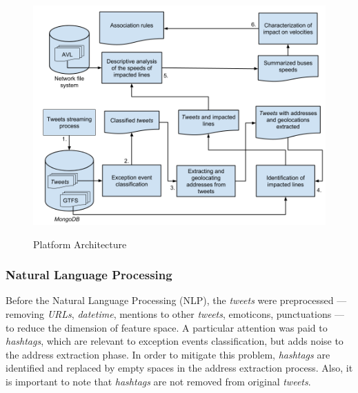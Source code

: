 \documentclass[runningheads]{llncs}
\begin{document}
\begin{figure}[!htb]
	\centering
 	  \caption{Platform Architecture}
		\includegraphics[width=0.7\linewidth]{caracterization_flow_en.png}
	\label{fig:caracterization_flow_en}
\end{figure}

\subsubsection{Natural Language Processing}
\label{nlp}

Before the Natural Language Processing (NLP), the \textit{tweets} were preprocessed --- removing \textit{URLs}, \textit{datetime}, mentions to other \textit{tweets}, emoticons, punctuations --- to reduce the dimension of feature space. A particular attention was paid to \textit{hashtags}, which are relevant to exception events classification, but adds noise to the address extraction phase. In order to mitigate this problem, \textit{hashtags} are identified and replaced by empty spaces in the address extraction process. Also, it is important to note that \textit{hashtags} are not removed from original \textit{tweets}.
\end{document}
